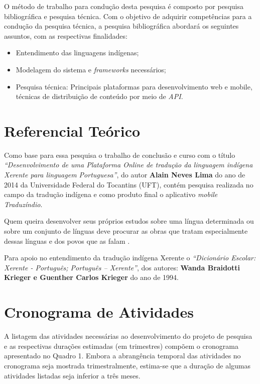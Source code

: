 \documentclass[journal]{IEEEtran}
\begin{document}
O método de trabalho para condução desta pesquisa é composto por pesquisa bibliográfica e pesquisa técnica. Com o objetivo de adquirir competências para a condução da pesquisa técnica, a pesquisa bibliográfica abordará os seguintes assuntos, com as respectivas finalidades:
\\
\begin{itemize}
    \item Entendimento das linguagens indígenas;
    \item Modelagem do sistema e {\it frameworks} necessários;
    \item Pesquisa técnica: Principais plataformas para desenvolvimento web e mobile, técnicas de distribuição de conteúdo por meio de {\it API}.
\end{itemize}

\section{Referencial Teórico}

Como base para essa pesquisa o trabalho de conclusão e curso com o título {\it “Desenvolvimento de uma Plataforma Online de tradução da linguagem indígena Xerente para linguagem Portuguesa”}, do autor {\bf Alain Neves Lima} do ano de 2014 da Universidade Federal do Tocantins (UFT), contém pesquisa realizada no campo da tradução indígena e como produto final o aplicativo {\it mobile  Traduzíndio}.


Quem queira desenvolver seus próprios estudos sobre uma língua determinada ou sobre um conjunto de línguas deve procurar as obras que tratam especialmente dessas línguas e dos povos que as falam \cite{rodrigues2002}.

Para apoio no entendimento da tradução indígena Xerente o {\it “Dicionário Escolar: Xerente - Português; Português – Xerente”}, dos autores: {\bf Wanda Braidotti Krieger e Guenther Carlos Krieger} do ano de 1994.

\section{Cronograma de Atividades}

A listagem das atividades necessárias ao desenvolvimento do projeto de pesquisa e as respectivas durações estimadas (em trimestres) compõem o cronograma apresentado no Quadro 1. Embora a abrangência temporal das atividades no cronograma seja mostrada trimestralmente, estima-se que a duração de algumas atividades listadas seja inferior a três meses.
\end{document}
